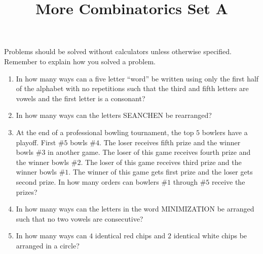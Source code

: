 \documentclass{article}
\title{More Combinatorics Set A}
\date{}
\author{}
\begin{document}
\maketitle
\noindent Problems should be solved without calculators unless otherwise 
specified. Remember to explain how you solved a problem.
\begin{enumerate}
    \item In how many ways can a five letter ``word'' be written using only 
        the first half of the alphabet with no repetitions such that the 
        third and fifth letters are vowels and the first letter is a 
        consonant?
        \vspace{3cm}
    \item In how many ways can the letters SEANCHEN be rearranged?
        \vspace{3cm}
    \item At the end of a professional bowling tournament, the top $5$ bowlers have a 
        playoff. First \#$5$ bowls \#$4$. The loser receives fifth prize and the winner 
        bowls \#$3$ in another game. The loser of this game receives fourth prize and the 
        winner bowls \#$2$. The loser of this game receives third prize and the winner bowls 
        \#$1$. The winner of this game gets first prize and the loser gets second prize. 
        In how many orders can bowlers \#$1$ through \#$5$ receive the prizes?
        \vspace{3cm}
    \item In how many ways can the letters in the word MINIMIZATION be arranged 
        such that no two vowels are consecutive?
        \vspace{3cm}
    \item In how many ways can $4$ identical red chips and $2$ identical white chips be 
        arranged in a circle?
        \vspace{3cm}
\end{enumerate}
\end{document}
